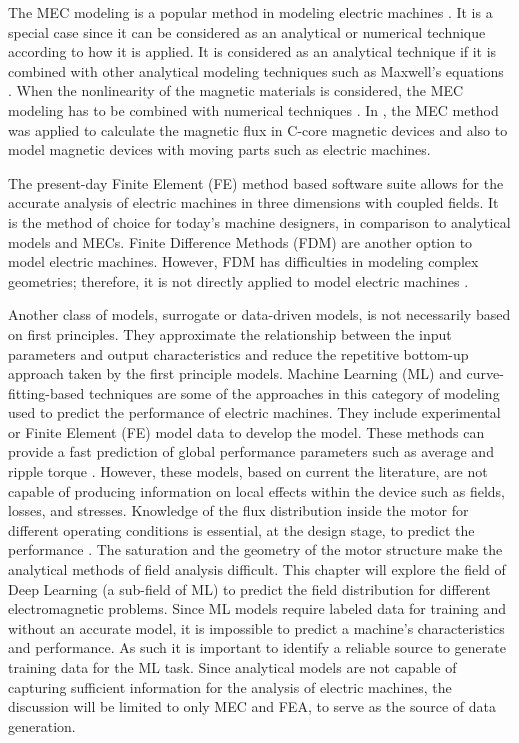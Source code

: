 The MEC modeling is a popular method in modeling electric machines \parencite{yilmaz2008capabilities}. It is a special case since it can be considered as an analytical or numerical technique according to how it is applied. It is considered as an analytical technique if it is combined with other analytical modeling techniques such as Maxwell’s equations \parencite{uddin2017analytical, radun2000analytically}. When the nonlinearity of the magnetic materials is considered, the MEC modeling has to be combined with numerical techniques \parencite{ostovic2012dynamics}. In \cite{ostovic2012dynamics}, the MEC method was applied to calculate the magnetic flux in C-core magnetic devices and also to model magnetic devices with moving parts such as electric machines.

The present-day Finite Element (FE) method based software suite allows for the accurate analysis of electric machines in three dimensions with coupled fields. It is the method of choice for today's machine designers, in comparison to analytical models and MECs. Finite Difference Methods (FDM) are another option to model electric machines. However, FDM has difficulties in modeling complex geometries; therefore, it is not directly applied to model electric machines \parencite{hameyer1999numerical}.

Another class of models, surrogate or data-driven models, is not necessarily based on first principles. They approximate the relationship between the input parameters and output characteristics and reduce the repetitive bottom-up approach taken by the first principle models. Machine Learning (ML) and curve-fitting-based techniques are some of the approaches in this category of modeling used to predict the performance of electric machines. 
They include experimental or Finite Element (FE) model data to develop the model. These methods can provide a fast prediction of global performance parameters such as average and ripple torque \parencite{mohammadi2019data, ibrahim2020surrogate}. 
However, these models, based on current the literature, are not capable of producing information on local effects within the device such as fields, losses, and stresses. Knowledge of the flux distribution inside the motor for different operating conditions is essential, at the design stage, to predict the performance \parencite{watthewaduge2020electromagnetic}. The saturation and the geometry of the motor structure make the analytical methods of field analysis difficult. This chapter will explore the field of Deep Learning (a sub-field of ML) to predict the field distribution for different electromagnetic problems. Since ML models require labeled data for training and without an accurate model, it is impossible to predict a machine's characteristics and performance. As such it is important to identify a reliable source to generate training data for the ML task. Since analytical models are not capable of capturing sufficient information for the analysis of electric machines, the discussion will be limited to only MEC and FEA, to serve as the source of data generation. 

